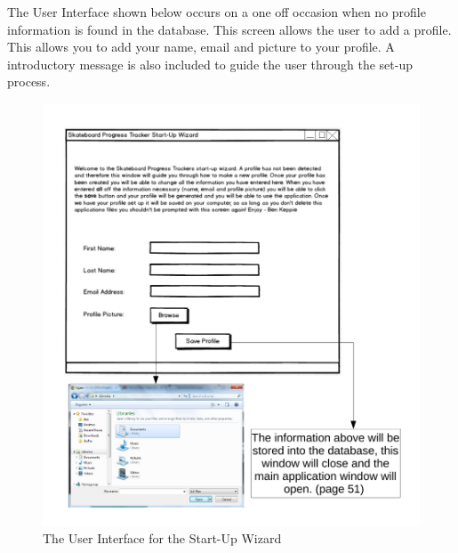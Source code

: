 The User Interface shown below occurs on a one off occasion when no profile information is found in the database. This screen allows the user to add a profile. This allows you to add your name, email and picture to your profile. A introductory message is also included to guide the user through the set-up process.
\begin{figure}[H]
    \includegraphics[width=\textwidth]{./Design/WizardUI.pdf}
    \caption{The User Interface for the Start-Up Wizard} \label{fig:Wizard User Interface}
\end{figure}

